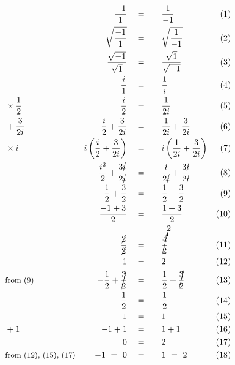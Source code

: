 \begin{alignat*}{5}
&\,&\frac{-1}{1}\quad&=\quad&&\frac{1}{-1}\quad&(1)\\
&\,&\sqrt{\frac{-1}{1}}\quad&=&&\sqrt{\frac{1}{-1}}&(2)\\
&\,&\frac{\sqrt{-1}}{\sqrt{1}}\quad&=&&\frac{\sqrt{1}}{\sqrt{-1}}&(3)\\
&\,&\frac{i}{1}\quad&=&&\frac{1}{i}&(4)\\
&\small\times\frac{1}{2}&\frac{i}{2}\quad&=&&\frac{1}{2i}&(5)\\
&\small+\frac{3}{2i}&\frac{i}{2}+\frac{3}{2i}\quad&=&&\frac{1}{2i}+\frac{3}{2i}&(6)\\
&\times i&i\left(\frac{i}{2}+\frac{3}{2i}\right)\quad&=&&i\left(\frac{1}{2i}+\frac{3}{2i}\right)&(7)\\
&\,&\frac{i^2}{2}+\frac{3\cancel{i}}{2\cancel{i}}\quad&=&&\frac{\cancel{i}}{2\cancel{i}}+\frac{3\cancel{i}}{2\cancel{i}}&(8)\\
&\,&-\frac{1}{2}+\frac{3}{2}\quad&=&&\frac{1}{2}+\frac{3}{2}&(9)\\
&\,&\frac{-1+3}{2}\quad&=&&\frac{1+3}{2}&(10)\\
&\,&\frac{\cancel{2}}{\cancel{2}}\quad&=&&\cancelto{2}{\frac{4}{2}}&(11)\\
&\,&1\quad&=&&2&(12)\\
&\small\text{from (9)}&-\frac{1}{2}+\cancel{\frac{3}{2}}\quad&=&&\frac{1}{2}+\cancel{\frac{3}{2}}&(13)\\
&\,&-\frac{1}{2}\quad&=&&\frac{1}{2}&(14)\\
&\,&-1\quad&=&&1&(15)\\
&\small+1&-1+1\quad&=&&1+1&(16)\\
&\,&0\quad&=&&2&(17)\\
&\small\text{from (12), (15), (17)}&-1~=~0\quad&=&&1~=~2&(18)
\end{alignat*}
